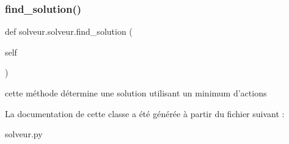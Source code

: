 \subsubsection{\texorpdfstring{find\+\_\+solution()}{find\_solution()}}
{\footnotesize\ttfamily def solveur.\+solveur.\+find\+\_\+solution (\begin{DoxyParamCaption}\item[{}]{self }\end{DoxyParamCaption})}

\begin{DoxyVerb}cette méthode détermine une solution utilisant un minimum d'actions
\end{DoxyVerb}
 

La documentation de cette classe a été générée à partir du fichier suivant \+:\begin{DoxyCompactItemize}
\item 
solveur.\+py\end{DoxyCompactItemize}
